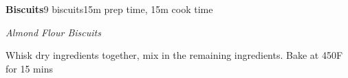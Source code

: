 \documentclass[../recipe-collections/cooking.tex]{subfiles}
\begin{document}
\begin{recipe}{\textbf{Biscuits}}{9 biscuits}{15m prep time, 15m cook time}

  \freeform{}\textit{Almond Flour Biscuits}


  Whisk dry ingredients together, mix in the remaining ingredients.
  Bake at 450F for 15 mins

  \freeform{}\hrulefill{}

\end{recipe}
\end{document}
